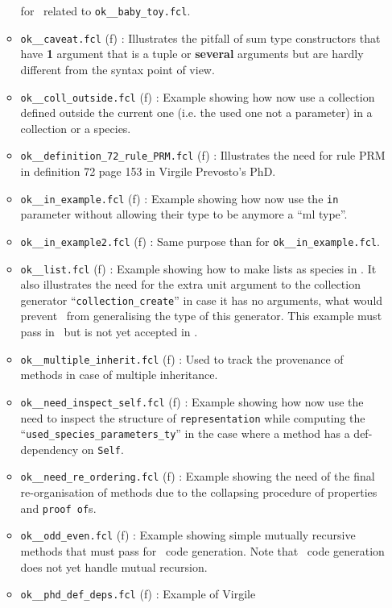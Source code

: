 \begin{itemize}
\begin{itemize}
    for \ocaml\ related to {\tt ok\_\_baby\_toy.fcl}.
  \item {\tt ok\_\_caveat.fcl} (f) : Illustrates the pitfall of sum
    type constructors that have {\bf 1} argument that is a tuple or
    {\bf several} arguments but are hardly different from the syntax
    point of view.
  \item {\tt ok\_\_coll\_outside.fcl} (f) : Example showing how now
    use a collection defined outside the current one (i.e. the used
    one not a parameter) in a collection or a species.
  \item {\tt ok\_\_definition\_72\_rule\_PRM.fcl} (f) : Illustrates
    the need for rule PRM in definition 72 page 153 in Virgile
    Prevosto's PhD.
    \item {\tt ok\_\_in\_example.fcl} (f) : Example showing how now
      use the {\tt in} parameter without allowing their type to be
      anymore a ``ml type''.
    \item {\tt ok\_\_in\_example2.fcl} (f) : Same purpose than for
      {\tt ok\_\_in\_example.fcl}.
    \item {\tt ok\_\_list.fcl} (f) : Example showing how to make lists
      as species in \focalize. It also illustrates the need for the
      extra unit argument to the collection generator
      ``{\tt collection\_create}'' in case it has no arguments, what
      would prevent \ocaml\ from generalising the type of this
      generator. This  example must pass in \ocaml\ but is not yet
      accepted in \coq.
    \item {\tt ok\_\_multiple\_inherit.fcl} (f) : Used to track the
      provenance of methods in case of multiple inheritance.
    \item {\tt ok\_\_need\_inspect\_self.fcl} (f) : Example showing
      how now use the need to inspect the structure of
      {\tt representation} while computing the \\
      ``{\tt used\_species\_parameters\_ty}'' in the case where a
      method has a  def-dependency on {\tt Self}.
    \item {\tt ok\_\_need\_re\_ordering.fcl} (f) : Example showing the
      need of the final re-organisation of methods due to the
      collapsing procedure of properties and {\tt proof of}s.
    \item {\tt ok\_\_odd\_even.fcl} (f) : Example showing simple
      mutually recursive methods that must pass for \ocaml\ code
      generation. Note that \coq\ code generation does not yet handle
      mutual recursion.
    \item {\tt ok\_\_phd\_def\_deps.fcl} (f) : Example of Virgile

\end{itemize}
\end{itemize}
